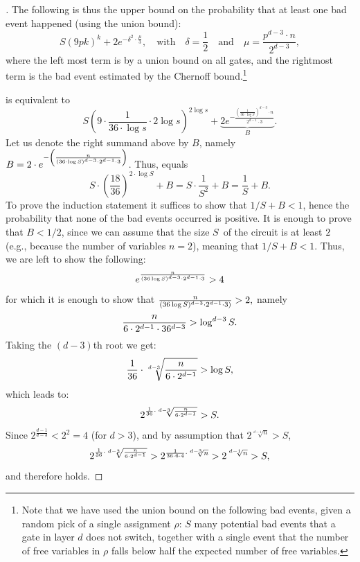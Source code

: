 \begin{proof}[]
The following is thus the upper bound on the probability that at least one bad event happened (using the union bound): 
\begin{equation}\label{eq:487:28}
 S(9pk)^k + 2e^{-\delta^2 \cdot \frac{\mu}{3}}, \quad \text{with} \quad \delta = \frac{1}{2} \quad \text{and} \quad \mu = \frac{p^{d-3} \cdot n}{2^{d-3}},
\end{equation}
where the left most term is by a union bound on all gates, and the rightmost term is the bad event estimated by the  Chernoff bound.\footnote{%
Note that we have used the union bound on the following bad events, given a random pick of a single assignment $\rho$: $S$ many potential bad events that a gate in layer $d$ does not switch, together with a single event that the number of free variables in $\rho$ falls below half the expected number of free variables.
}



 is equivalent to 
\begin{equation}\label{eq:498:27}
S \left( 9 \cdot \frac{1}{36 \cdot \log s} \cdot 2 \log s \right)^{2 \log s} + 
\underbrace{2 e^{-\frac{\left(\frac{1}{36 \cdot \log S }\right)^{d-3} \cdot n}{2^{d-1} \cdot 3}}}_B.
\end{equation}Let us denote the right summand above by $B$, namely $B=2\cdot
e^{-\left(\frac{n}{{(36 \cdot \log S)^{d-3} \cdot 2^{d-1} \cdot 3}}\right)}$.  
Thus,  equals
$$
S \cdot\left(\frac{18}{36}\right)^{2 \cdot \log S}+B =S \cdot \frac{1}{S^2}+B =
\frac{1}{S}+
B.
$$
To prove the induction statement it  suffices to show that $1/S+B<1$, hence the probability that none of the bad events occurred is positive. It is enough to prove  that $B<1/2$, since we can assume that the size $S$\ of the circuit is at least $2$ (e.g., because the number of variables $n=2$), meaning that $1/S+B<1$. Thus, we are left to show the following:
\[
e^{\frac{n}{(36 \log S)^{d-3} \cdot 2^{d-1}\cdot 3}} > 4
\]
for which it is enough to show that 
$
\frac{n}{(36 \log S)^{d-3} \cdot 2^{d-1}\cdot 3)}>2,
$
namely
\[
\frac{n}{6 \cdot 2^{d-1}\cdot 36^{d-3}} > \log^{d-3} S.
\]
Taking the $(d-3)$th root we get:
\[
\frac{1}{36}\cdot \sqrt[d-3]{\frac{n}{6 \cdot 2^{d-1}}} > \log S,
\]
which leads to:
\begin{equation}\label{eq:534:30}
2^{
\frac{1}{36}\cdot \sqrt[d-3]{\frac{n}{6 \cdot 2^{d-1}}}
} >  S.
\end{equation}
Since $2^{\frac{d-1}{d-3}} < 2^2 = 4$ (for $d>3$), and by assumption that $ 2^{
\sqrt[d-1]{n}
}>S$,    
$$
2^{
\frac{1}{36}\cdot \sqrt[d-3]{\frac{n}{6 \cdot 2^{d-1}}}}>
2^{
\frac{1}{36\cdot 6\cdot 4}\cdot\sqrt[d-3]{n}
}
> 2^{
\sqrt[d-1]{n}
}>S,
$$
and therefore   holds. 
\mbox{}
\end{proof} %


